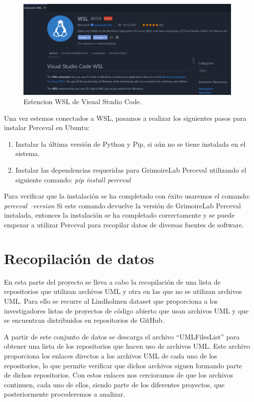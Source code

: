 \documentclass[a4paper, 12pt]{book}
\begin{document}
\begin{figure}
  \centering
  \includegraphics[width=14cm, keepaspectratio]{img/extension_wsl.PNG}
  \caption{Estencion WSL de Visual Studio Code.}\label{fig:estensionwsl}
\end{figure}

Una vez estemos conectados a WSL, pasamos a realizar los siguientes pasos para instalar Perceval en Ubuntu:
\begin{enumerate}
  \item Instalar la última versión de Python y Pip, si aún no se tiene instalada en el sistema.
  \item Instalar las dependencias requeridas para GrimoireLab Perceval utilizando el siguiente comando: \emph{pip install perceval}
\end{enumerate}

Para verificar que la instalación se ha completado con éxito usaremos el comando: \emph{perceval --version} 
Si este comando devuelve la versión de GrimoireLab Perceval instalada, entonces la instalación se ha completado correctamente y se puede empezar a utilizar Perceval para recopilar datos de diversas fuentes de software.

\section{Recopilación de datos} %
\label{sec:recopilación de datos}

En esta parte del proyecto se lleva a cabo la recopilación de una lista de repositorios que utilizan archivos UML y otra en las que no se utilizan archivos UML.
Para ello se recurre al Lindholmen dataset que proporciona a los investigadores listas de proyectos de código abierto que usan archivos UML y que se encuentran distribuidos en repositorios de GitHub.

A partir de este conjunto de datos se descarga el archivo ``UMLFilesList'' para obtener una lista de los repositorios que hacen uso de archivos UML.
Este archivo proporciona los enlaces directos a los archivos UML de cada uno de los repositorios, lo que permite verificar que dichos archivos siguen formando parte de dichos repositorios.
Con estos enlaces nos cercioramos de que los archivos continuen, cada uno de ellos, siendo parte de los diferentes proyectos, que posteriormente procederemos a analizar. 
\end{document}
